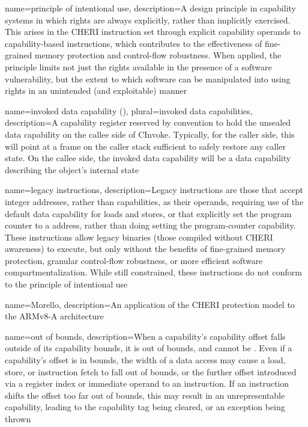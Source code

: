 {
  name=principle of intentional use,
  description={A design principle in capability systems in which rights are
    always explicitly, rather than implicitly exercised.
    This arises in the CHERI instruction set through explicit \gls{capability}
    operands to \gls{capability-based instructions}, which contributes to the
    effectiveness of \gls{fine-grained memory protection} and
    \gls{control-flow robustness}.
    When applied, the principle limits not just the rights available in the
    presence of a software vulnerability, but the extent to which software can
    be manipulated into using rights in an unintended (and exploitable)
    manner}
}

{
  name=invoked data capability (\IDC{}),
  plural=invoked data capabilities,
  description={A capability register reserved by convention to hold the
    unsealed \gls{data capability} on the callee side of \gls{CInvoke}.
    Typically, for the caller side, this will point at a frame on the caller
    stack sufficient to safely restore any caller state.
    On the callee side, the invoked data capability will be a data capability
    describing the object's internal state}
}

{
  name=legacy instructions,
  description={Legacy instructions are those that accept integer addresses,
    rather than capabilities, as their operands, requiring use of the
    \gls{default data capability} for loads and stores, or that explicitly set
    the program counter to a address, rather than doing setting the
    \gls{program-counter capability}.
    These instructions allow legacy binaries (those compiled without CHERI
    awareness) to execute, but only without the benefits of
    \gls{fine-grained memory protection}, granular \gls{control-flow
    robustness}, or more efficient \gls{software compartmentalization}.
    While still constrained, these instructions do not conform to the
    \gls{principle of intentional use}}
}

{
  name=Morello,
  description={An application of the CHERI protection model to the ARMv8-A architecture}
}

{
  name=out of bounds,
  description={When a \gls{capability}'s \gls{capability offset} falls outside
    of its \gls{capability bounds}, it is out of bounds, and cannot be
    .
    Even if a capability's offset is in bounds, the width of a data access may
    cause a load, store, or instruction fetch to fall out of bounds, or the
    further offset introduced via a register index or immediate operand to an
    instruction.
    If an instruction shifts the offset
    too far out of bounds, this may result in an \gls{unrepresentable
    capability}, leading to the \gls{capability tag} being cleared, or an
    exception being thrown}
}

